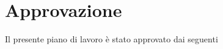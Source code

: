 \section*{Approvazione}
Il presente piano di lavoro è stato approvato dai seguenti

\noindent

\vspace*{2cm}


    



\begin{flushright}
\dataApprovazione
\end{flushright}
